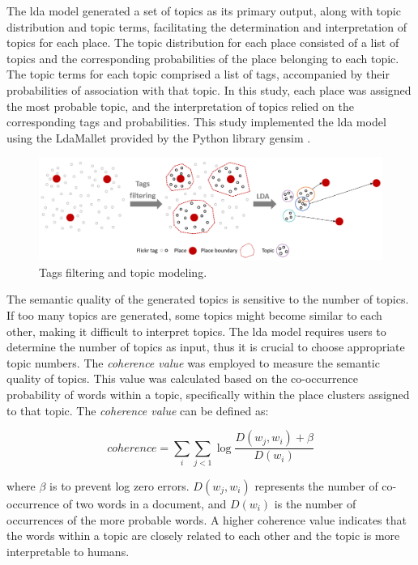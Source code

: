 \documentclass{article}
\theoremstyle{remark}
\begin{document}
The \acrshort{lda} model generated a set of topics as its primary output, along with topic distribution and topic terms, facilitating the determination and interpretation of topics for each place. The topic distribution for each place consisted of a list of topics and the corresponding probabilities of the place belonging to each topic. The topic terms for each topic comprised a list of tags, accompanied by their probabilities of association with that topic. In this study, each place was assigned the most probable topic, and the interpretation of topics relied on the corresponding tags and probabilities. This study implemented the \acrshort{lda} model using the LdaMallet provided by the Python library gensim \citep{rehurek_software_2010}.

\begin{figure} [!h]
\centering
\includegraphics[width=1\textwidth]{figures/topic_modeling_methodology.png}
\caption{\label{fig:topic_modeling_methodology}Tags filtering and topic modeling.}
\end{figure}

The semantic quality of the generated topics is sensitive to the number of topics. If too many topics are generated, some topics might become similar to each other, making it difficult to interpret topics. The \acrshort{lda} model requires users to determine the number of topics as input, thus it is crucial to choose appropriate topic numbers. The \textit{coherence value} was employed to measure the semantic quality of topics. This value was calculated based on the co-occurrence probability of words within a topic, specifically within the place clusters assigned to that topic. The \textit{coherence value} can be defined as:

\begin{equation} \label{eq:coherence_value}
    coherence = \sum_{i}\sum_{j<1}\log\frac{D(w_{j},w_{i})+\beta}{D(w_{i})}
\end{equation}

where $\beta$ is to prevent log zero errors. $D(w_{j},w_{i})$ represents the number of co-occurrence of two words in a document, and $D(w_{i})$ is the number of occurrences of the more probable words. A higher coherence value indicates that the words within a topic are closely related to each other and the topic is more interpretable to humans.
\end{document}
